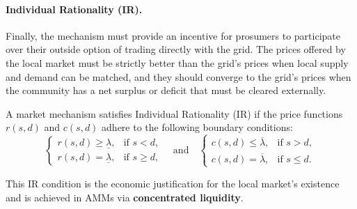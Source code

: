 \documentclass[12pt, notitlepage]{article}
\begin{document}

\paragraph{Individual Rationality (IR).}
Finally, the mechanism must provide an incentive for prosumers to participate over their outside option of trading directly with the grid. The prices offered by the local market must be strictly better than the grid's prices when local supply and demand can be matched, and they should converge to the grid's prices when the community has a net surplus or deficit that must be cleared externally.

\begin{axiom} \label{ax:IR} 
A market mechanism satisfies Individual Rationality (IR) if the price functions $r(s,d)$ and $c(s,d)$ adhere to the following boundary conditions:
\begin{equation}
\label{eq:IR}
\begin{cases}
r(s,d) \geq \underline{\lambda}, & \text{if } s < d, \\
r(s,d) = \underline{\lambda}, & \text{if } s \ge d,
\end{cases}
\quad \text{and} \quad
\begin{cases}
c(s,d) \leq \overline{\lambda}, & \text{if } s > d, \\
c(s,d) = \overline{\lambda}, & \text{if } s \le d.
\end{cases}
\end{equation}
\end{axiom}

This IR condition is the economic justification for the local market's existence and is achieved in AMMs via \textbf{concentrated liquidity}.
\end{document}
